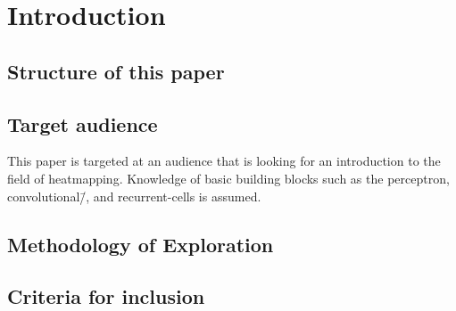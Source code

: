 \section{Introduction}
\blindtext[3]

\subsection{Structure of this paper}
\blindtext[3]

\subsection{Target audience}
This paper is targeted at an audience that is looking for an introduction to 
the field of heatmapping. Knowledge of basic building blocks such as the 
perceptron, convolutional\=/, and recurrent-cells is assumed.

\subsection{Methodology of Exploration}
\blindtext[3]

\subsection{Criteria for inclusion}
\blindtext[3]